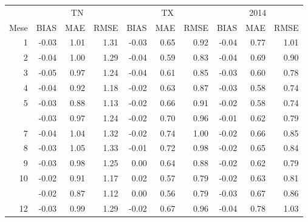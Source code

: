 
\begin{tabular}[t]{rrrrrrrrrr}
\toprule
\multicolumn{1}{c}{ } & \multicolumn{3}{c}{TN} & \multicolumn{3}{c}{TX} & \multicolumn{3}{c}{2014\tnote{*}} \\
\cmidrule(l{3pt}r{3pt}){2-4} \cmidrule(l{3pt}r{3pt}){5-7} \cmidrule(l{3pt}r{3pt}){8-10}
Mese & BIAS & MAE & RMSE & BIAS & MAE & RMSE & BIAS & MAE & RMSE\\
\midrule
1 & -0.03 & 1.01 & 1.31 & -0.03 & 0.65 & 0.92 & -0.04 & 0.77 & 1.01\\
2 & -0.04 & 1.00 & 1.29 & -0.04 & 0.59 & 0.83 & -0.04 & 0.69 & 0.90\\
3 & -0.05 & 0.97 & 1.24 & -0.04 & 0.61 & 0.85 & -0.03 & 0.60 & 0.78\\
4 & -0.04 & 0.92 & 1.18 & -0.02 & 0.63 & 0.87 & -0.03 & 0.58 & 0.74\\
5 & -0.03 & 0.88 & 1.13 & -0.02 & 0.66 & 0.91 & -0.02 & 0.58 & 0.74\\
\addlinespace
6 & -0.03 & 0.97 & 1.24 & -0.02 & 0.70 & 0.96 & -0.01 & 0.62 & 0.79\\
7 & -0.04 & 1.04 & 1.32 & -0.02 & 0.74 & 1.00 & -0.02 & 0.66 & 0.85\\
8 & -0.03 & 1.05 & 1.33 & -0.01 & 0.72 & 0.98 & -0.02 & 0.65 & 0.84\\
9 & -0.03 & 0.98 & 1.25 & 0.00 & 0.64 & 0.88 & -0.02 & 0.62 & 0.79\\
10 & -0.02 & 0.91 & 1.17 & 0.02 & 0.57 & 0.79 & -0.02 & 0.63 & 0.81\\
\addlinespace
11 & -0.02 & 0.87 & 1.12 & 0.00 & 0.56 & 0.79 & -0.03 & 0.67 & 0.86\\
12 & -0.03 & 0.99 & 1.29 & -0.02 & 0.67 & 0.96 & -0.04 & 0.78 & 1.03\\
\bottomrule
\end{tabular}